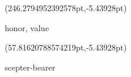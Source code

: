 \documentclass{ransom}
\begin{document}
\begin{foreignpage}
{\begin{textblock*}{42.0pt}(246.2794952392578pt,\pdfpageheight-152.18824768066406pt-5.43928pt)\parbox[b]{42.0pt}{\begin{blacktext}\begin{latin}honor, value\end{latin}\end{blacktext}}\end{textblock*}
\begin{textblock*}{60.83504pt}(57.81620788574219pt,\pdfpageheight-125.18824768066406pt-5.43928pt)\parbox[b]{60.83504pt}{\begin{blacktext}\begin{latin}scepter-bearer\end{latin}\end{blacktext}}\end{textblock*}
 }
\end{foreignpage}
\end{document}
